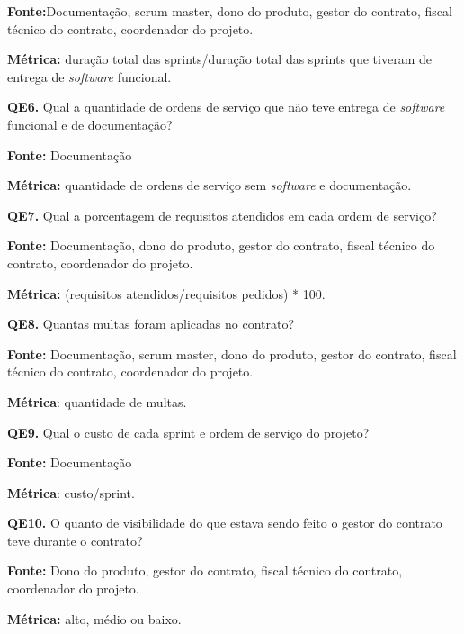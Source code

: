 \textbf{Fonte:}Documentação, scrum master, dono do produto, gestor do contrato, fiscal técnico do contrato, coordenador do projeto.

\textbf{Métrica:} duração total das sprints/duração total das sprints que tiveram de entrega de \textit{software} funcional.

 \vspace{\onelineskip} 

\textbf{QE6.} Qual a quantidade de ordens de serviço que não teve entrega de \textit{software} funcional e de documentação?

\textbf{Fonte:} Documentação

\textbf{Métrica:} quantidade de ordens de serviço sem \textit{software} e documentação.

 \vspace{\onelineskip} 
 
\textbf{QE7.} Qual a porcentagem de requisitos atendidos em cada ordem de serviço?

\textbf{Fonte:} Documentação, dono do produto, gestor do contrato, fiscal técnico do contrato, coordenador do projeto.

\textbf{Métrica:} (requisitos atendidos/requisitos pedidos) * 100.
 
 \vspace{\onelineskip} 

\textbf{QE8.} Quantas multas foram aplicadas no contrato?

\textbf{Fonte:} Documentação, scrum master, dono do produto, gestor do contrato, fiscal técnico do contrato, coordenador do projeto.

\textbf{Métrica}: quantidade de multas.

 \vspace{\onelineskip}  

\textbf{QE9.} Qual o custo de cada sprint e ordem de serviço do projeto?

\textbf{Fonte:} Documentação

\textbf{Métrica}: custo/sprint.

 \vspace{\onelineskip}  

\textbf{QE10.} O quanto de visibilidade do que estava sendo feito o gestor do contrato teve durante o contrato?

\textbf{Fonte:} Dono do produto, gestor do contrato, fiscal técnico do contrato, coordenador do projeto.

\textbf{Métrica:} alto, médio ou baixo. 
 
